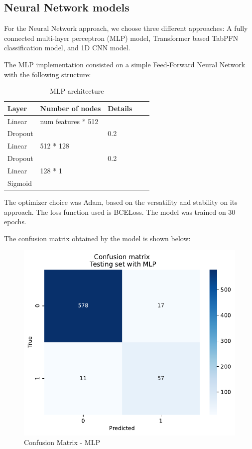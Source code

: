 \documentclass[10pt,letterpaper]{article}
\begin{document}
\subsection{Neural Network models}

For the Neural Network approach, we choose three different approaches: A fully connected multi-layer perceptron (MLP) model, Transformer based TabPFN classification model, and 1D CNN model. 

The MLP implementation consisted on a simple Feed-Forward Neural Network with the following structure:

\begin{table}[H]
\centering
\footnotesize
\begin{tabular}{lllll}
\toprule
\textbf{Layer} & \textbf{Number of nodes} & \textbf{Details} \\
\midrule
Linear & num features * 512 & \\
Dropout &  & 0.2 \\
Linear& 512 * 128 & \\
Dropout & & 0.2 \\
Linear & 128 * 1 & \\
Sigmoid & & \\
\bottomrule
\end{tabular}
\caption{MLP architecture}
\end{table}

The optimizer choice was Adam, based on the versatility and stability on its approach. The loss function used is BCELoss. The model was trained on 30 epochs. 

The confusion matrix obtained by the model is shown below:

\begin{figure}[H]
    \centering
    \includegraphics[width=0.5\linewidth]{plots/nn_confusion_matrix.pdf}
    \caption{Confusion Matrix - MLP}
    \label{fig:cm-nn}
\end{figure}
\end{document}
